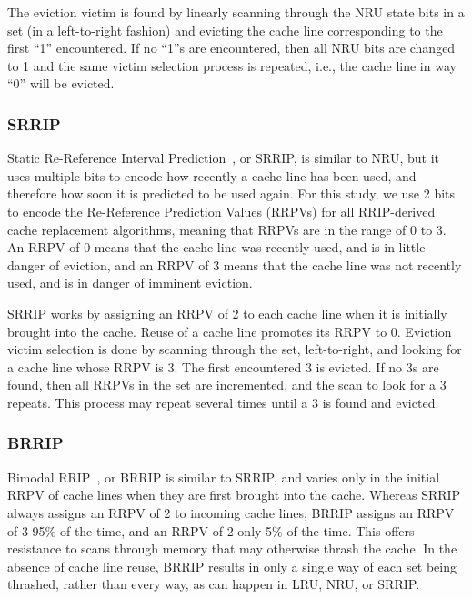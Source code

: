 The eviction victim is found by linearly scanning through the NRU state bits in a set (in a left-to-right fashion) and evicting the cache line corresponding to the first ``1'' encountered. 
If no ``1''s are encountered, then all NRU bits are changed to 1 and the same victim selection process is repeated, i.e., the cache line in way ``0'' will be evicted.
\subsubsection{SRRIP}

Static Re-Reference Interval Prediction~\cite{jaleeltheobald10}, or SRRIP, is similar to NRU, but it uses multiple bits to encode how recently a cache line has been used, and therefore how soon it is predicted to be used again.  For this study, we use 2 bits to encode the Re-Reference Prediction Values (RRPVs) for all RRIP-derived cache replacement algorithms, meaning that RRPVs are in the range of 0 to 3.  An RRPV of 0 means that the cache line was recently used, and is in little danger of eviction, and an RRPV of 3 means that the cache line was not recently used, and is in danger of imminent eviction.

SRRIP works by assigning an RRPV of 2 to each cache line when it is initially brought into the cache.  Reuse of a cache line promotes its RRPV to 0.  Eviction victim selection is done by scanning through the set, left-to-right, and looking for a cache line whose RRPV is 3.  The first encountered 3 is evicted.  If no 3s are found, then all RRPVs in the set are incremented, and the scan to look for a 3 repeats.  This process may repeat several times until a 3 is found and evicted.

\subsubsection{BRRIP}

Bimodal RRIP~\cite{jaleeltheobald10}, or BRRIP is similar to SRRIP, and varies only in the initial RRPV of cache lines when they are first brought into the cache.  Whereas SRRIP always assigns an RRPV of 2 to incoming cache lines, BRRIP assigns an RRPV of 3 95\% of the time, and an RRPV of 2 only 5\% of the time.  This offers resistance to scans through memory that may otherwise thrash the cache.  In the absence of cache line reuse, BRRIP results in only a single way of each set being thrashed, rather than every way, as can happen in LRU, NRU, or SRRIP.

